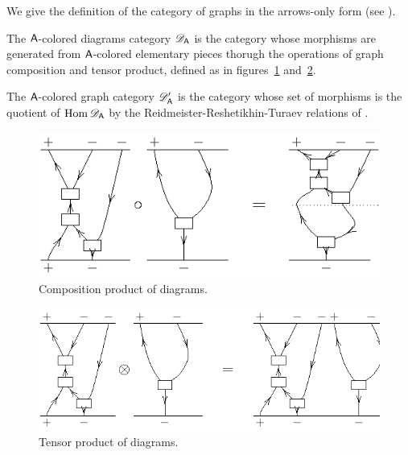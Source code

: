 We give the definition of the category of graphs in the arrows-only
form (see ). 
\begin{definition}
  The $\A$-colored diagrams category $\RTD[\A]$ is the category whose
  morphisms are generated from $\A$-colored elementary pieces thorugh
  the operations of graph composition and tensor product, defined as
  in figures~\ref{fig:gc-graph-composition}
  and~\ref{fig:gc-graph-otimes}.
  
  The $\A$-colored graph category $\RTE[\A]$ is the category whose set
  of morphisms is the quotient of $\Hom\RTD[\A]$ by the
  Reidmeister-Reshetikhin-Turaev relations of .
\end{definition}
\begin{figure}[p]
  \centering\includegraphics{fig-001}
  \caption{Composition product of diagrams.}
  \label{fig:gc-graph-composition}
\end{figure}
\begin{figure}[p]
  \centering\includegraphics{fig-002}
  \caption{Tensor product of diagrams.}
  \label{fig:gc-graph-otimes}
\end{figure}
